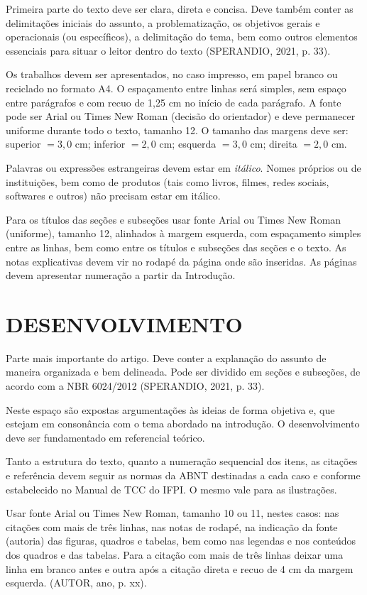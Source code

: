 \documentclass[12pt, a4paper]{article}
\newenvironment{citacaolonga}{
    \vspace{\baselineskip}
    \small
    \begin{list}{}{
        \setlength{\leftmargin}{4cm}
        \setlength{\rightmargin}{0cm}
        \setlength{\listparindent}{\parindent}
        \setlength{\itemindent}{0pt}
        \setlength{\parsep}{0pt}
    }
    \item\relax
}{\end{list}\vspace{\baselineskip}}
\begin{document}
Primeira parte do texto deve ser clara, direta e concisa. Deve também conter as delimitações iniciais do assunto, a problematização, os objetivos gerais e operacionais (ou específicos), a delimitação do tema, bem como outros elementos essenciais para situar o leitor dentro do texto (SPERANDIO, 2021, p. 33).

Os trabalhos devem ser apresentados, no caso impresso, em papel branco ou reciclado no formato A4. O espaçamento entre linhas será simples, sem espaço entre parágrafos e com recuo de 1,25 cm no início de cada parágrafo. A fonte pode ser Arial ou Times New Roman (decisão do orientador) e deve permanecer uniforme durante todo o texto, tamanho 12. O tamanho das margens deve ser: superior $= 3,0$ cm; inferior $= 2,0$ cm; esquerda $= 3,0$ cm; direita $= 2,0$ cm.

Palavras ou expressões estrangeiras devem estar em \textit{itálico}. Nomes próprios ou de instituições, bem como de produtos (tais como livros, filmes, redes sociais, softwares e outros) não precisam estar em itálico.

Para os títulos das seções e subseções usar fonte Arial ou Times New Roman (uniforme), tamanho 12, alinhados à margem esquerda, com espaçamento simples entre as linhas, bem como entre os títulos e subseções das seções e o texto. As notas explicativas devem vir no rodapé da página onde são inseridas. As páginas devem apresentar numeração a partir da Introdução.

\section{DESENVOLVIMENTO}

Parte mais importante do artigo. Deve conter a explanação do assunto de maneira organizada e bem delineada. Pode ser dividido em seções e subseções, de acordo com a NBR 6024/2012 (SPERANDIO, 2021, p. 33).

Neste espaço são expostas argumentações às ideias de forma objetiva e, que estejam em consonância com o tema abordado na introdução. O desenvolvimento deve ser fundamentado em referencial teórico.

Tanto a estrutura do texto, quanto a numeração sequencial dos itens, as citações e referência devem seguir as normas da ABNT destinadas a cada caso e conforme estabelecido no Manual de TCC do IFPI. O mesmo vale para as ilustrações.

\begin{citacaolonga}
Usar fonte Arial ou Times New Roman, tamanho 10 ou 11, nestes casos: nas citações com mais de três linhas, nas notas de rodapé, na indicação da fonte (autoria) das figuras, quadros e tabelas, bem como nas legendas e nos conteúdos dos quadros e das tabelas. Para a citação com mais de três linhas deixar uma linha em branco antes e outra após a citação direta e recuo de 4 cm da margem esquerda. (AUTOR, ano, p. xx).
\end{citacaolonga}
\end{document}
